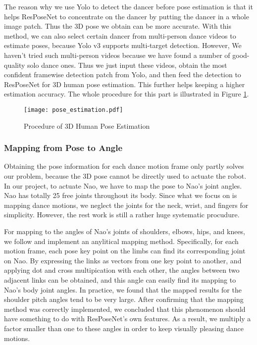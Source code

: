 \documentclass[UTF8,a4paper]{article}
\begin{document}
	The reason why we use Yolo to detect the dancer before pose estimation is that it helps ResPoseNet to concentrate on the dancer by putting the dancer in a whole image patch. Thus the 3D pose we obtain can be more accurate. With this method, we can also select certain dancer from multi-person dance videos to estimate poses, because Yolo v3 supports multi-target detection. However, We haven't tried such multi-person videos because we have found a number of good-quality solo dance ones. Thus we just input these videos, obtain the most confident framewise detection patch from Yolo, and then feed the detection to ResPoseNet for 3D human pose estimation. This further helps keeping a higher estimation accuracy. The whole procedure for this part is illustrated in Figure \ref{motion}.

	\begin{figure}[htb]
		\centering
		\texttt{[image: pose\_estimation.pdf]}
		\caption{Procedure of 3D Human Pose Estimation}
		\label{motion}
	\end{figure}

	\subsubsection{Mapping from Pose to Angle}

	\noindent Obtaining the pose information for each dance motion frame only partly solves our problem, because the 3D pose cannot be directly used to actuate the robot. In our project, to actuate Nao, we have to map the pose to Nao's joint angles. Nao has totally 25 free joints throughout its body. Since what we focus on is mapping dance motions, we neglect the joints for the neck, wrist, and fingers for simplicity. However, the rest work is still a rather huge systematic procudure.

	For mapping to the angles of Nao's joints of shoulders, elbows, hips, and knees, we follow \cite{lei2015whole} and implement an anylitical mapping method. Specifically, for each motion frame, each pose key point on the limbs can find its corresponding joint on Nao. By expressing the links as vectors from one key point to another, and applying dot and cross multipication with each other, the angles between two adjacent links can be obtained, and this angle can easily find its mapping to Nao's body joint angles. In practice, we found that the mapped results for the shoulder pitch angles tend to be very large. After confirming that the mapping method was correctly implemented, we concluded that this phenomenon should have something to do with ResPoseNet's own features. As a result, we multiply a factor smaller than one to these angles in order to keep visually pleasing dance motions.
\end{document}
